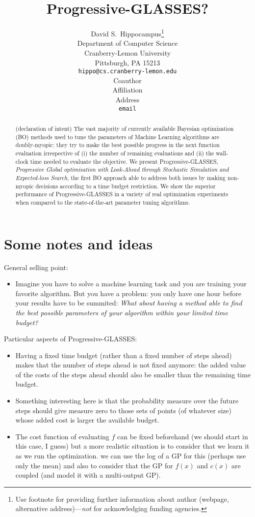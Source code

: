 \documentclass{article} %
\title{
    Progressive-GLASSES?
}
\author{
David S.~Hippocampus\thanks{ Use footnote for providing further information about author (webpage, alternative address)---\emph{not} for acknowledging funding agencies.} \\
Department of Computer Science\\
Cranberry-Lemon University\\
Pittsburgh, PA 15213 \\
\texttt{hippo@cs.cranberry-lemon.edu} \\
\And
Coauthor \\
Affiliation \\
Address \\
\texttt{email} \\
}
\begin{document}
\maketitle

\begin{abstract}

(declaration of intent) The vast majority of currently available Bayesian optimization (BO) methods used to tune the parameters of Machine Learning algorithms are doubly-myopic: they try to make the best possible progress in the next function evaluation irrespective of (i) the number of remaining evaluations and (ii) the wall-clock time needed to  evaluate the objective. We present Progressive-GLASSES, \emph{Progressive Global optimisation with Look-Ahead through Stochastic Simulation and Expected-loss Search}, the first BO approach able to address both issues
 by making non-myopic decisions according to a time budget restriction. We show the superior performance  of Progressive-GLASSES in a  variety of real optimization experiments when compared to the state-of-the-art parameter tuning algorithms. 




\end{abstract}

\section{Some notes and ideas} %
\label{sec:introduction}


General selling point:

\begin{itemize}
\item Imagine you have to solve a machine learning task and you are training your favorite algorithm. But you have a problem: you only have one hour before your results have to be summited: \emph{What about having a method able to find the best possible parameters of your algorithm within your limited time budget?}
\end{itemize}

Particular aspects of Progressive-GLASSES:

\begin{itemize}
\item Having a fixed time budget (rather than a fixed number of steps ahead)  makes that  the number of steps ahead is not fixed anymore: the added  value of the costs of the steps ahead should also be smaller than the remaining time budget. 
\item Something interesting here is that the probability measure over the future steps should give measure zero to those sets of points (of whatever size) whose added cost is larger the available budget.
\item The cost function of evaluating $f$ can be fixed beforehand (we should start in this case, I guess) but a more realistic situation is to consider that we learn it as we run the optimization. we can use the log of a GP for this (perhaps use only the mean) and also to consider that the GP for $f(x)$ and $c(x)$ are coupled (and model it with a multi-output GP).
\end{itemize}
\end{document}
